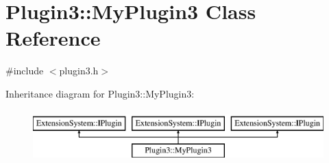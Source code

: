 \hypertarget{class_plugin3_1_1_my_plugin3}{\section{\-Plugin3\-:\-:\-My\-Plugin3 \-Class \-Reference}
\label{class_plugin3_1_1_my_plugin3}
}


{\ttfamily \#include $<$plugin3.\-h$>$}

\-Inheritance diagram for \-Plugin3\-:\-:\-My\-Plugin3\-:\begin{figure}[H]
\begin{center}
\leavevmode
\includegraphics[height=2.000000cm]{class_plugin3_1_1_my_plugin3}
\end{center}
\end{figure}
